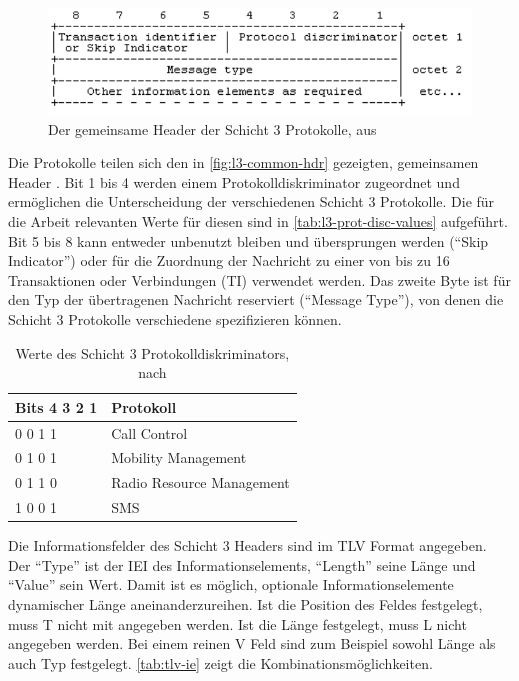 \begin{figure}[H]
	\centering \includegraphics[width=0.9\linewidth]{figures/24008_fig_10-1.pdf}
	\caption[Der gemeinsame Header der Schicht 3 Protokolle]{Der gemeinsame Header der Schicht 3 Protokolle, aus \citep[Abb. 10.1]{3gpp:24.008}} \label{fig:l3-common-hdr}
\end{figure}

Die Protokolle teilen sich den in \autoref{fig:l3-common-hdr} gezeigten, gemeinsamen Header \citep[11.2.3.1]{3gpp:24.007}. Bit 1 bis 4 werden einem Protokolldiskriminator zugeordnet und ermöglichen die Unterscheidung der verschiedenen Schicht 3 Protokolle. Die für die Arbeit relevanten Werte für diesen sind in \autoref{tab:l3-prot-disc-values} aufgeführt. Bit 5 bis 8 kann entweder unbenutzt bleiben und übersprungen werden ("`Skip Indicator"') oder für die Zuordnung der Nachricht zu einer von bis zu 16 Transaktionen oder Verbindungen (\ac{TI}) verwendet werden. Das zweite Byte ist für den Typ der übertragenen Nachricht reserviert ("`Message Type"'), von denen die Schicht 3 Protokolle verschiedene spezifizieren können. 

\begin{table}[H]
\centering
\begin{tabular}{|l|l|}
\hline
Bits 4 3 2 1 & Protokoll                 \\ \hline
0 0 1 1      & Call Control              \\ \hline
0 1 0 1      & Mobility Management       \\ \hline
0 1 1 0      & Radio Resource Management \\ \hline
1 0 0 1      & SMS                       \\ \hline
\end{tabular}
\caption[Werte des Schicht 3 Protokolldiskriminators]{Werte des Schicht 3 Protokolldiskriminators, nach \citep[Tabelle 11.2]{3gpp:24.007}}
\label{tab:l3-prot-disc-values}
\end{table}

Die Informationsfelder des Schicht 3 Headers sind im \ac{TLV} Format angegeben. Der "`Type"' ist der \ac{IEI} des Informationselements, "`Length"' seine Länge und "`Value"' sein Wert. Damit ist es möglich, optionale Informationselemente dynamischer Länge aneinanderzureihen. Ist die Position des Feldes festgelegt, muss T nicht mit angegeben werden. Ist die Länge festgelegt, muss L nicht angegeben werden. Bei einem reinen V Feld sind zum Beispiel sowohl Länge als auch Typ festgelegt. \autoref{tab:tlv-ie} zeigt die Kombinationsmöglichkeiten.

